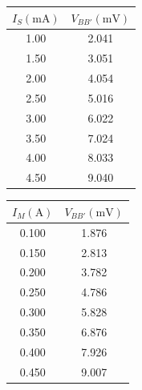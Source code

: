 \documentclass[UTF8]{ctexart}
\begin{document}
\begin{minipage}{0.5\textwidth}
  \centering
  \begin{tabular}{cc}
    \hline\hline
    $I_S(\mathrm{mA})$ & $V_{BB'}(\mathrm{mV})$ \\
    \hline
    1.00 & 2.041 \\
    1.50 & 3.051 \\
    2.00 & 4.054 \\
    2.50 & 5.016 \\
    3.00 & 6.022 \\
    3.50 & 7.024 \\
    4.00 & 8.033 \\
    4.50 & 9.040 \\
    \hline\hline
  \end{tabular}
\end{minipage}
\begin{minipage}{0.5\textwidth}
  \centering
  \begin{tabular}{cc}
    \hline\hline
    $I_M(\mathrm{A})$ & $V_{BB'}(\mathrm{mV})$ \\
    \hline
    0.100 & 1.876 \\
    0.150 & 2.813 \\
    0.200 & 3.782 \\
    0.250 & 4.786 \\
    0.300 & 5.828 \\
    0.350 & 6.876 \\
    0.400 & 7.926 \\
    0.450 & 9.007 \\
    \hline\hline
  \end{tabular}
\end{minipage}
\end{document}
